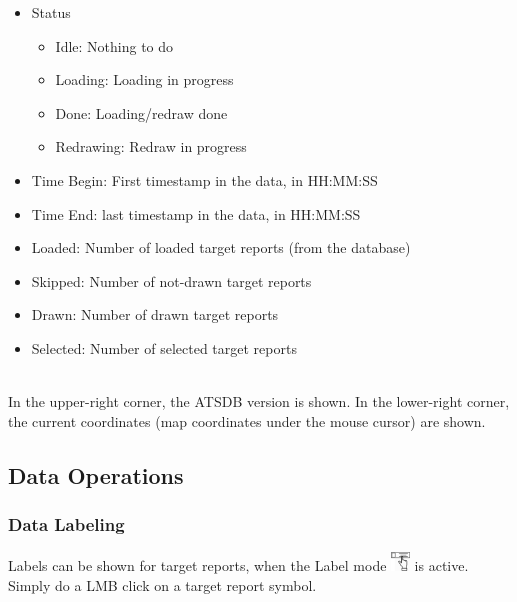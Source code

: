 \begin{itemize}
 \item Status
\begin{itemize}
 \item Idle: Nothing to do
 \item Loading: Loading in progress
 \item Done: Loading/redraw done
 \item Redrawing: Redraw in progress
\end{itemize}
 \item Time Begin: First timestamp in the data, in HH:MM:SS
 \item Time End: last timestamp in the data, in HH:MM:SS
 \item Loaded: Number of loaded target reports (from the database)
 \item Skipped: Number of not-drawn target reports
 \item Drawn: Number of drawn target reports
 \item Selected: Number of selected target reports
\end{itemize}
\  \\

In the upper-right corner, the ATSDB version is shown. In the lower-right corner, the current coordinates (map coordinates under the mouse cursor) are shown. 

\subsection{Data Operations}

\subsubsection{Data Labeling}

Labels can be shown for target reports, when the Label mode \includegraphics[width=0.5cm,frame]{../../data/icons/label_action.png} is active. Simply do a LMB click on a target report symbol.

